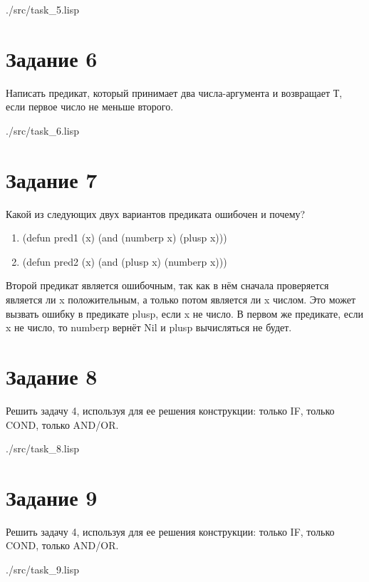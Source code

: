 \begin{lstinputlisting}[
	caption={Задание 5},
	label={lst:t5},
	style={lsp},
	]{./src/task_5.lisp}
\end{lstinputlisting}

\section*{Задание 6}
Написать предикат, который принимает два числа-аргумента и возвращает Т, если первое число не меньше второго.

\begin{lstinputlisting}[
	caption={Задание 6},
	label={lst:t6},
	style={lsp},
	]{./src/task_6.lisp}
\end{lstinputlisting}

\section*{Задание 7}
Какой из следующих двух вариантов предиката ошибочен и почему?

\begin{enumerate}
	\item (defun pred1 (x) (and (numberp x) (plusp x)))
	\item (defun pred2 (x) (and (plusp x) (numberp x)))
\end{enumerate}

Второй предикат является ошибочным, так как в нём сначала проверяется является ли x положительным, а только потом является ли x числом. Это может вызвать ошибку в предикате plusp, если x не число. В первом же предикате, если x не число, то numberp вернёт Nil и plusp вычисляться не будет. 

\section*{Задание 8}
Решить задачу 4, используя для ее решения конструкции: только IF, только COND, только AND/OR.

\begin{lstinputlisting}[
	caption={Задание 8},
	label={lst:t8},
	style={lsp},
	]{./src/task_8.lisp}
\end{lstinputlisting}

\section*{Задание 9}
Решить задачу 4, используя для ее решения конструкции: только IF, только COND, только AND/OR.

\begin{lstinputlisting}[
	caption={Задание 9},
	label={lst:t9},
	style={lsp},
	]{./src/task_9.lisp}
\end{lstinputlisting}